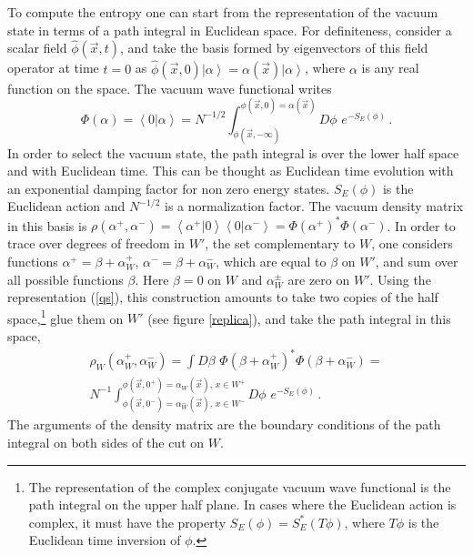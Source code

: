 \documentclass[12pt]{article}
\numberwithin{equation}{section}
\begin{document}
To compute the entropy one can start from the representation of the vacuum state in terms of a path integral in Euclidean space.  For definiteness, consider a scalar field $\hat{\phi}(\vec{x},t)$, and take the basis formed by eigenvectors of this field operator at time $t=0$ as $\hat{\phi} (\vec{x},0) \left|  \alpha\right>= \alpha(\vec{x})\left|  \alpha\right>$, where $\alpha$ is any real function on the space. The vacuum wave functional writes   
\begin{equation}
\Phi(\alpha)=\left<0|\alpha\right>=N^{-1/2}\int_{\phi(\vec{x},-\infty)}^{\phi(\vec{x},0)=\alpha(\vec{x})} D\phi\,\, e^{-S_E(\phi)}\,. \label{qs}
\end{equation} 
In order to select the vacuum state, the path integral is over the lower half space and with Euclidean time. This can be thought as Euclidean time evolution with an exponential damping factor for non zero energy states.  $S_E(\phi)$ is the Euclidean action and $N^{-1/2}$ is a normalization factor. The vacuum density matrix in this basis is
$\rho(\alpha^+,\alpha^-)=\left<\alpha^+ | 0\right> \left< 0| \alpha^-\right>=\Phi(\alpha^+)^*\Phi(\alpha^-)$. In order to trace over degrees of freedom in $W'$, the set complementary to $W$, one considers functions $\alpha^+=\beta + \alpha_{W}^+$, $\alpha^-=\beta+ \alpha^-_{W}$, which are equal to $\beta$ on $W'$, and sum over all possible functions $\beta$. Here $\beta=0$ on $W$ and $\alpha^\pm_W$ are zero on $W'$.  Using the representation (\ref{qs}), this construction amounts to take two copies of the half space,\footnote{The representation of the complex conjugate vacuum wave functional is the path integral on the upper half plane. In cases where the Euclidean action is complex, it must have the property $S_E(\phi)=S_E^*(T\phi)$, where $T\phi$ is the Euclidean time inversion of $\phi$.} glue them on $W'$ (see figure \ref{replica}), and take the path integral in this space,
\begin{multline}
\rho_W(\alpha_{W}^+,\alpha^-_{W})=\int D\beta\,\, \Phi(\beta + \alpha_{W}^+)^* \Phi(\beta+ \alpha^-_{W})= \\
N^{-1}\int_{\phi(\vec{x},0^-)=\alpha^-_W(\vec{x}),\, x\in W^- }^{\phi(\vec{x},0^+)=\alpha_W(\vec{x}),\,x\in W^+} D\phi\,\, e^{-S_E(\phi)}\,. \label{opre}
\end{multline}
The arguments of the density matrix are the boundary conditions of the path integral on both sides of the cut on $W$. 
\end{document}
